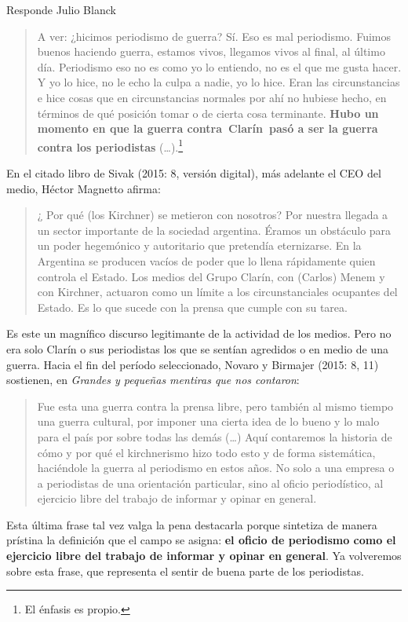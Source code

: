 {Responde Julio Blanck

\begin{quote}
A ver: ¿hicimos periodismo de guerra? Sí. Eso es mal periodismo. Fuimos buenos haciendo guerra, estamos vivos, llegamos vivos al final, al último día. Periodismo eso no es como yo lo entiendo, no es el que me gusta hacer. Y yo lo hice, no le echo la culpa a nadie, yo lo hice. Eran las circunstancias e hice cosas que en circunstancias normales por ahí no hubiese hecho, en términos de qué posición tomar o de cierta cosa terminante. \textbf{Hubo un momento en que la guerra contra~Clarín~pasó a ser la guerra contra los periodistas} (\ldots).\footnote{El énfasis es propio.}
\end{quote}

En el citado libro de Sivak (2015: 8, versión digital), más adelante el CEO del medio, Héctor Magnetto afirma:

\begin{quote}
¿ Por qué (los Kirchner) se metieron con nosotros? Por nuestra llegada a un sector importante de la sociedad argentina. Éramos un obstáculo para un poder hegemónico y autoritario que pretendía eternizarse. En la Argentina se producen vacíos de poder que lo llena rápidamente quien controla el Estado. Los medios del Grupo Clarín, con (Carlos) Menem y con Kirchner, actuaron como un límite a los circunstanciales ocupantes del Estado. Es lo que sucede con la prensa que cumple con su tarea.
\end{quote}

Es este un magnífico discurso legitimante de la actividad de los medios. Pero no era solo Clarín o sus periodistas los que se sentían agredidos o en medio de una guerra. Hacia el fin del período seleccionado, Novaro y Birmajer (2015: 8, 11) sostienen, en \emph{Grandes y pequeñas mentiras que nos contaron}:

\begin{quote}
Fue esta una guerra contra la prensa libre, pero también al mismo tiempo una guerra cultural, por imponer una cierta idea de lo bueno y lo malo para el país por sobre todas las demás (\ldots) Aquí contaremos la historia de cómo y por qué el kirchnerismo hizo todo esto y de forma sistemática, haciéndole la guerra al periodismo en estos años. No solo a una empresa o a periodistas de una orientación particular, sino al oficio periodístico, al ejercicio libre del trabajo de informar y opinar en general.
\end{quote}

Esta última frase tal vez valga la pena destacarla porque sintetiza de manera prístina la definición que el campo se asigna: \textbf{el oficio de periodismo como el ejercicio libre del trabajo de informar y opinar en general}. Ya volveremos sobre esta frase, que representa el sentir de buena parte de los periodistas.

}
